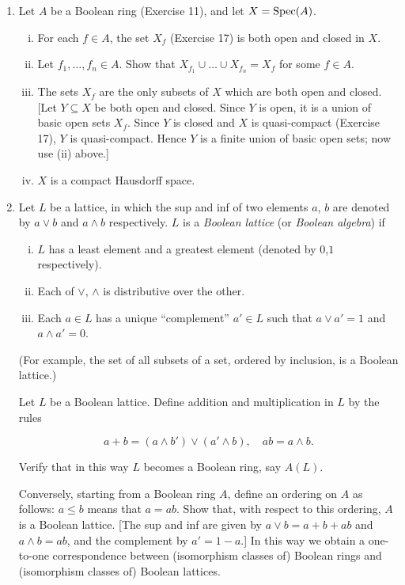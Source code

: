 \documentclass[class=book, crop=false]{standalone}
\theoremstyle{definition}
\theoremstyle{remark}
\begin{document}
\begin{enumerate}[resume*=exc1]
\item Let $A$ be a Boolean ring (Exercise 11), and let $X=\operatorname{Spec}(A)$.
\begin{enumerate}[i)]
  \item For each $f \in A$, the set $X_{f}$ (Exercise 17) is both open and closed in
$X$.
  \item Let $f_{1}, \ldots, f_{n} \in A$. Show that
$X_{f_{1}} \cup \ldots \cup X_{f_{n}}=X_{f}$ for some $f \in A$.
  \item The sets $X_{f}$ are the only subsets of $X$ which are both open and closed.
[Let $Y \subseteq X$ be both open and closed. Since $Y$ is open, it is a union
of basic open sets $X_{f}$. Since $Y$ is closed and $X$ is quasi-compact
(Exercise 17), $Y$ is quasi-compact. Hence $Y$ is a finite union of basic open
sets; now use (ii) above.]
  \item $X$ is a compact Hausdorff space.
\end{enumerate}

  \item Let $L$ be a lattice, in which the sup and inf of two elements $a$, $b$
        are denoted by $a \vee b$ and $a \wedge b$ respectively. $L$ is a
        \textit{Boolean lattice} (or \textit{Boolean algebra}) if
\begin{enumerate}[i)]
  \item $L$ has a least element and a greatest element (denoted by $0$,$1$ respectively).
  \item Each of $\vee$, $\wedge$ is distributive over the other.
  \item Each $a \in L$ has a unique ``complement'' $a' \in L$ such that
$a \vee a'=1$ and $a \wedge a'=0$.
\end{enumerate}
(For example, the set of all subsets of a set, ordered by inclusion, is a
Boolean lattice.)

Let $L$ be a Boolean lattice. Define addition and multiplication in $L$ by the
rules

\[
  a+b=\left(a \wedge b'\right) \vee\left(a' \wedge b\right), \quad a b=a \wedge b .
\]

Verify that in this way $L$ becomes a Boolean ring, say $A(L)$.

Conversely, starting from a Boolean ring $A$, define an ordering on $A$ as
follows: $a \leq b$ means that $a=a b$. Show that, with respect to this
ordering, $A$ is a Boolean lattice. [The sup and inf are given by
$a \vee b=a+b+a b$ and $a \wedge b=a b$, and the complement by
$a'=1-a$.] In this way we obtain a one-to-one correspondence between
(isomorphism classes of) Boolean rings and (isomorphism classes of) Boolean
lattices.


\end{enumerate}
\end{document}
